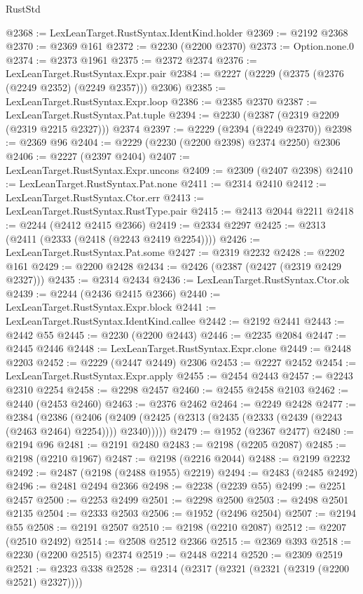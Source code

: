 \begin{lexlean}{RustStd}
\begin{coremodule}
@2368 := LexLeanTarget.RustSyntax.IdentKind.holder
@2369 := @2192 @2368
@2370 := @2369 @161
@2372 := @2230 (@2200 @2370)
@2373 := Option.none.{0}
@2374 := @2373 @1961
@2375 := @2372 @2374
@2376 := LexLeanTarget.RustSyntax.Expr.pair
@2384 := @2227 (@2229 (@2375 (@2376 (@2249 @2352) (@2249 @2357))) @2306)
@2385 := LexLeanTarget.RustSyntax.Expr.loop
@2386 := @2385 @2370
@2387 := LexLeanTarget.RustSyntax.Pat.tuple
@2394 := @2230 (@2387 (@2319 @2209 (@2319 @2215 @2327))) @2374
@2397 := @2229 (@2394 (@2249 @2370))
@2398 := @2369 @96
@2404 := @2229 (@2230 (@2200 @2398) @2374 @2250) @2306
@2406 := @2227 (@2397 @2404)
@2407 := LexLeanTarget.RustSyntax.Expr.uncons
@2409 := @2309 (@2407 @2398)
@2410 := LexLeanTarget.RustSyntax.Pat.none
@2411 := @2314 @2410
@2412 := LexLeanTarget.RustSyntax.Ctor.err
@2413 := LexLeanTarget.RustSyntax.RustType.pair
@2415 := @2413 @2044 @2211
@2418 := @2244 (@2412 @2415 @2366)
@2419 := @2334 @2297
@2425 := @2313 (@2411 (@2333 (@2418 (@2243 @2419 @2254))))
@2426 := LexLeanTarget.RustSyntax.Pat.some
@2427 := @2319 @2232
@2428 := @2202 @161
@2429 := @2200 @2428
@2434 := @2426 (@2387 (@2427 (@2319 @2429 @2327)))
@2435 := @2314 @2434
@2436 := LexLeanTarget.RustSyntax.Ctor.ok
@2439 := @2244 (@2436 @2415 @2366)
@2440 := LexLeanTarget.RustSyntax.Expr.block
@2441 := LexLeanTarget.RustSyntax.IdentKind.callee
@2442 := @2192 @2441
@2443 := @2442 @55
@2445 := @2230 (@2200 @2443)
@2446 := @2235 @2084
@2447 := @2445 @2446
@2448 := LexLeanTarget.RustSyntax.Expr.clone
@2449 := @2448 @2203
@2452 := @2229 (@2447 @2449) @2306
@2453 := @2227 @2452
@2454 := LexLeanTarget.RustSyntax.Expr.apply
@2455 := @2454 @2443
@2457 := @2243 @2310 @2254
@2458 := @2298 @2457
@2460 := @2455 @2458 @2103
@2462 := @2440 (@2453 @2460)
@2463 := @2376 @2462
@2464 := @2249 @2428
@2477 := @2384
    (@2386
      (@2406 (@2409 (@2425 (@2313 (@2435 (@2333 (@2439 (@2243 (@2463 @2464) @2254)))) @2340)))))
@2479 := @1952 (@2367 @2477)
@2480 := @2194 @96
@2481 := @2191 @2480
@2483 := @2198 (@2205 @2087)
@2485 := @2198 (@2210 @1967)
@2487 := @2198 (@2216 @2044)
@2488 := @2199 @2232
@2492 := @2487 (@2198 (@2488 @1955) @2219)
@2494 := @2483 (@2485 @2492)
@2496 := @2481 @2494 @2366
@2498 := @2238 (@2239 @55)
@2499 := @2251 @2457
@2500 := @2253 @2499
@2501 := @2298 @2500
@2503 := @2498 @2501 @2135
@2504 := @2333 @2503
@2506 := @1952 (@2496 @2504)
@2507 := @2194 @55
@2508 := @2191 @2507
@2510 := @2198 (@2210 @2087)
@2512 := @2207 (@2510 @2492)
@2514 := @2508 @2512 @2366
@2515 := @2369 @393
@2518 := @2230 (@2200 @2515) @2374
@2519 := @2448 @2214
@2520 := @2309 @2519
@2521 := @2323 @338
@2528 := @2314 (@2317 (@2321 (@2321 (@2319 (@2200 @2521) @2327))))

\end{coremodule}
\end{lexlean}
